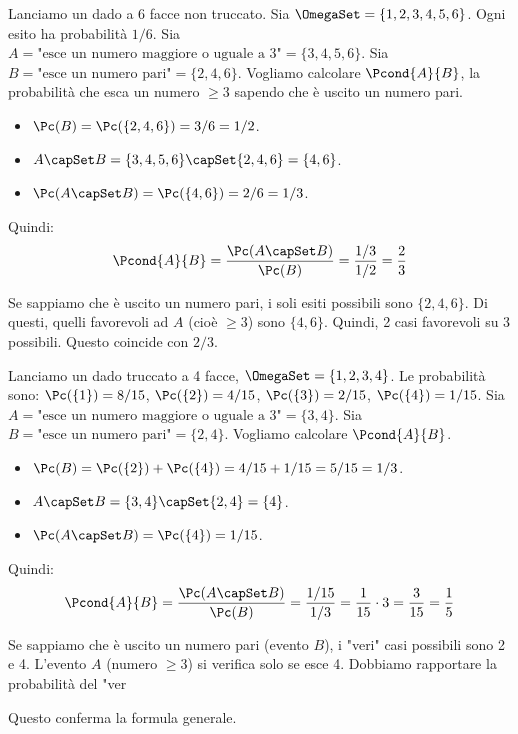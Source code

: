 \begin{example}
Lanciamo un dado a 6 facce non truccato.
Sia $\OmegaSet = \{1, 2, 3, 4, 5, 6\}$. Ogni esito ha probabilità $1/6$.
Sia $A = \text{"esce un numero maggiore o uguale a 3"} = \{3, 4, 5, 6\}$.
Sia $B = \text{"esce un numero pari"} = \{2, 4, 6\}$.
Vogliamo calcolare $\Pcond{A}{B}$, la probabilità che esca un numero $\ge 3$ sapendo che è uscito un numero pari.

\begin{itemize}
    \item $\Pc(B) = \Pc(\{2, 4, 6\}) = 3/6 = 1/2$.
    \item $A \capSet B = \{3, 4, 5, 6\} \capSet \{2, 4, 6\} = \{4, 6\}$.
    \item $\Pc(A \capSet B) = \Pc(\{4, 6\}) = 2/6 = 1/3$.
\end{itemize}
Quindi:
\[ \Pcond{A}{B} = \frac{\Pc(A \capSet B)}{\Pc(B)} = \frac{1/3}{1/2} = \frac{2}{3} \]
\begin{remark}
Se sappiamo che è uscito un numero pari, i soli esiti possibili sono $\{2, 4, 6\}$. Di questi, quelli favorevoli ad $A$ (cioè $\ge 3$) sono $\{4, 6\}$. Quindi, 2 casi favorevoli su 3 possibili. Questo coincide con $2/3$.
\end{remark}
\end{example}

\begin{example}
Lanciamo un dado truccato a 4 facce, $\OmegaSet = \{1, 2, 3, 4\}$.
Le probabilità sono:
$\Pc(\{1\}) = 8/15$, $\Pc(\{2\}) = 4/15$, $\Pc(\{3\}) = 2/15$, $\Pc(\{4\}) = 1/15$.
Sia $A = \text{"esce un numero maggiore o uguale a 3"} = \{3, 4\}$.
Sia $B = \text{"esce un numero pari"} = \{2, 4\}$.
Vogliamo calcolare $\Pcond{A}{B}$.

\begin{itemize}
    \item $\Pc(B) = \Pc(\{2\}) + \Pc(\{4\}) = 4/15 + 1/15 = 5/15 = 1/3$.
    \item $A \capSet B = \{3, 4\} \capSet \{2, 4\} = \{4\}$.
    \item $\Pc(A \capSet B) = \Pc(\{4\}) = 1/15$.
\end{itemize}
Quindi:
\[ \Pcond{A}{B} = \frac{\Pc(A \capSet B)}{\Pc(B)} = \frac{1/15}{1/3} = \frac{1}{15} \cdot 3 = \frac{3}{15} = \frac{1}{5} \]
\begin{remark}
Se sappiamo che è uscito un numero pari (evento $B$), i "veri" casi possibili sono 2 e 4. L'evento $A$ (numero $\ge 3$) si verifica solo se esce 4. Dobbiamo rapportare la probabilità del "ver
\end{remark}
Questo conferma la formula generale.
\end{example}

